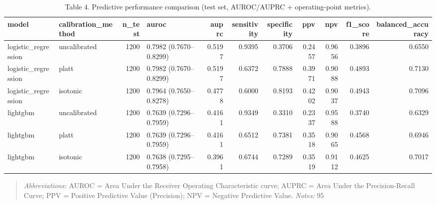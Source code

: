 \begin{table}[htbp]
\centering
\caption{Table 4. Predictive performance comparison (test set, AUROC/AUPRC + operating-point metrics).}
\label{table4_predictive_performance}
\begin{tabular}{llrlrrrrrrr}
\toprule
model & calibration\_method & n\_test & auroc & auprc & sensitivity & specificity & ppv & npv & f1\_score & balanced\_accuracy \\
\midrule
logistic\_regression & uncalibrated & 1200 & 0.7982 (0.7670–0.8299) & 0.5197 & 0.9395 & 0.3706 & 0.2457 & 0.9656 & 0.3896 & 0.6550 \\
logistic\_regression & platt & 1200 & 0.7982 (0.7670–0.8299) & 0.5197 & 0.6372 & 0.7888 & 0.3971 & 0.9088 & 0.4893 & 0.7130 \\
logistic\_regression & isotonic & 1200 & 0.7964 (0.7650–0.8278) & 0.4778 & 0.6000 & 0.8193 & 0.4202 & 0.9037 & 0.4943 & 0.7096 \\
lightgbm & uncalibrated & 1200 & 0.7639 (0.7296–0.7959) & 0.4161 & 0.9349 & 0.3310 & 0.2337 & 0.9588 & 0.3740 & 0.6329 \\
lightgbm & platt & 1200 & 0.7639 (0.7296–0.7959) & 0.4161 & 0.6512 & 0.7381 & 0.3518 & 0.9065 & 0.4568 & 0.6946 \\
lightgbm & isotonic & 1200 & 0.7638 (0.7295–0.7958) & 0.3961 & 0.6744 & 0.7289 & 0.3519 & 0.9112 & 0.4625 & 0.7017 \\
\bottomrule
\end{tabular}

\end{table}


\begin{quote}\small
\textit{Abbreviations:} AUROC = Area Under the Receiver Operating Characteristic curve; AUPRC = Area Under the Precision-Recall Curve; PPV = Positive Predictive Value (Precision); NPV = Negative Predictive Value.
\textit{Notes:} 95%
\end{quote}